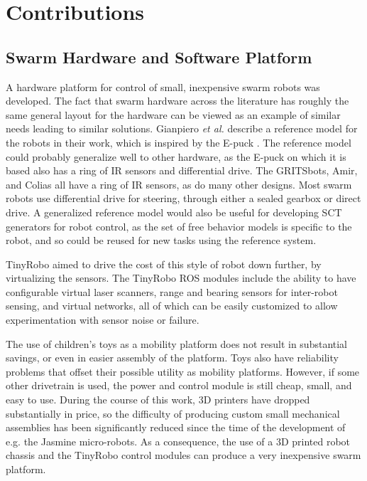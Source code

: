 \chapter{Contributions} \label{chapter:Contributions}

\section{Swarm Hardware and Software Platform}

A hardware platform for control of small, inexpensive swarm robots was developed. 
The fact that swarm hardware across the literature has roughly the same general layout for the hardware can be viewed as an example of similar needs leading to similar solutions.
Gianpiero \emph{et al.} describe a reference model for the robots in their work, which is inspired by the E-puck \citep{francesca2014automode}.
The reference model could probably generalize well to other hardware, as the E-puck on which it is based also has a ring of IR sensors and differential drive. 
The GRITSbots, Amir, and Colias all have a ring of IR sensors, as do many other designs. 
Most swarm robots use differential drive for steering, through either a sealed gearbox or direct drive.
A generalized reference model would also be useful for developing SCT generators for robot control, as the set of free behavior models is specific to the robot, and so could be reused for new tasks using the reference system. 

TinyRobo aimed to drive the cost of this style of robot down further, by virtualizing the sensors. 
The TinyRobo ROS modules include the ability to have configurable virtual laser scanners, range and bearing sensors for inter-robot sensing, and virtual networks, all of which can be easily customized to allow experimentation with sensor noise or failure. 

The use of children's toys as a mobility platform does not result in substantial savings, or even in easier assembly of the platform. 
Toys also have reliability problems that offset their possible utility as mobility platforms. 
However, if some other drivetrain is used, the power and control module is still cheap, small, and easy to use. During the course of this work, 3D printers have dropped substantially in price, so the difficulty of producing custom small mechanical assemblies has been significantly reduced since the time of the development of e.g. the Jasmine micro-robots. 
As a consequence, the use of a 3D printed robot chassis and the TinyRobo control modules can produce a very inexpensive swarm platform. 

